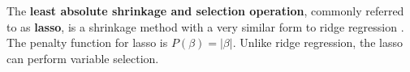 \documentclass{article}
\begin{document}

	
	The \textbf{least absolute shrinkage and selection operation}, commonly referred to as \textbf{lasso}, is a shrinkage method with a very similar form to ridge regression \cite{tibshirani1996regression, james2013introduction}. The penalty function for lasso is $P(\beta) = \vert \beta \vert$. Unlike ridge regression, the lasso can perform variable selection.
	

	
\end{document}
